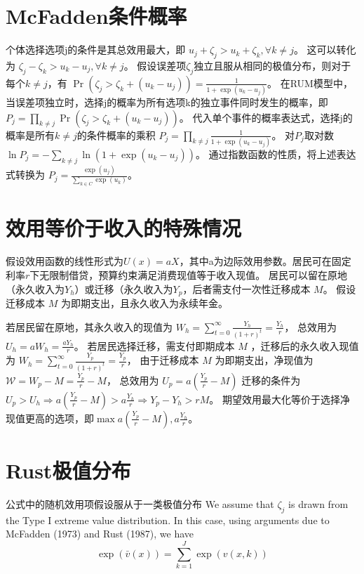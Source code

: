 \documentclass[
  a4paper,
  zihao=-4,
  fontset=mac,
  AutoFakeBold,
  AutoFakeSlant,
  oneside]{ctexbook}
\begin{document}
\chapter{McFadden条件概率}

个体选择选项j的条件是其总效用最大，即
$u_j + \zeta_j > u_k + \zeta_k, \forall k \neq j$。
这可以转化为
$\zeta_j - \zeta_k > u_k - u_j, \forall k \neq j$。
假设误差项$\zeta_j$独立且服从相同的极值分布，则对于每个$k \neq j$，有
$\Pr(\zeta_j > \zeta_k + (u_k - u_j)) = \frac{1}{1 + \exp(u_k - u_j)}$。
在RUM模型中，当误差项独立时，选择j的概率为所有选项k的独立事件同时发生的概率，即
$P_j = \prod\limits_{k \neq j} \Pr(\zeta_j > \zeta_k + (u_k - u_j))$。
代入单个事件的概率表达式，选择j的概率是所有$k \neq j$的条件概率的乘积
$P_j = \prod\limits_{k \neq j} \frac{1}{1 + \exp(u_k - u_j)}$。
对$P_j$取对数
$\ln P_j = - \sum_{k \neq j} \ln(1 + \exp(u_k - u_j))$。
通过指数函数的性质，将上述表达式转换为
$P_j = \frac{\exp(u_j)}{\sum\limits_{k \in C} \exp(u_k)}$。

\chapter{效用等价于收入的特殊情况}
假设效用函数的线性形式为$U(x)=a X$，其中a为边际效用参数。居民可在固定利率$r$下无限制借贷，预算约束满足消费现值等于收入现值。
居民可以留在原地（永久收入为$Y_h$）或迁移（永久收入为$Y_p$，后者需支付一次性迁移成本 $M$。
假设迁移成本 
$M$
为即期支出，且永久收入为永续年金。

若居民留在原地，其永久收入的现值为
$W_h = \sum\limits_{t=0}^\infty \frac{Y_h}{(1+r)^t}=\frac{Y_h}{r}$，
总效用为$U_h=a W_h = \frac{a Y_h}{r}$。
若居民选择迁移，需支付即期成本 
$M$
，迁移后的永久收入现值为
$W_h = \sum\limits_{t=0}^\infty \frac{Y_p}{(1+r)^t}=\frac{Y_p}{r}$，
由于迁移成本 
$M$
为即期支出，净现值为
$\mathcal{W}=W_p-M=\frac{Y_p}{r}-M$，
总效用为
$U_p=a(\frac{Y_p}{r}-M)$
迁移的条件为$U_p>U_h \Rightarrow a(\frac{Y_p}{r}-M) > a \frac{ Y_h}{r} \Rightarrow Y_p-Y_h > rM$。
期望效用最大化等价于选择净现值更高的选项，即$\max{a(\frac{Y_p}{r}-M), a \frac{ Y_h}{r}}$。

\chapter{Rust极值分布}
公式中的随机效用项假设服从于一类极值分布
We assume that $\zeta_j$ is drawn from the Type I extreme value distribution. In this case, using arguments due to McFadden (1973) and Rust (1987), we have
$$\exp\left(\bar{v}(x)\right) = \sum_{k=1}^J \exp\left(v(x, k)\right)$$
\end{document}
